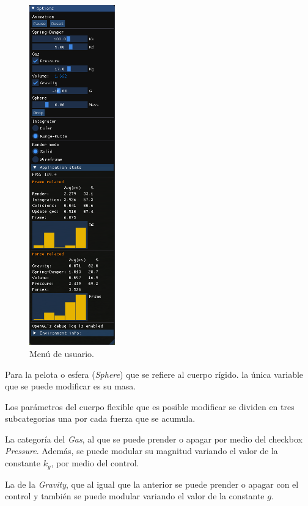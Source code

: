 \begin{figure}
 \centering
 \includegraphics[width=0.33\textwidth]{Img/04/menu}
 \caption[Menú de usuario del programa]{Menú de usuario.}
 \label{programa:menu}
\end{figure}

Para la pelota o esfera (\emph{\textenglish{Sphere}}) que se refiere al cuerpo rígido.
la única variable que se puede modificar es su masa.

Los parámetros del cuerpo flexible que es posible modificar se dividen en tres subcategorias una por cada fuerza que se acumula.

La categoría del \emph{Gas}, al que se puede prender o apagar por medio del checkbox \emph{\textenglish{Pressure}}. 
Además, se puede modular su magnitud variando el valor de la constante $k_{g}$, por medio del control.

La de la \emph{\textenglish{Gravity}}, que al igual que la anterior se puede prender o apagar con el control  y también se puede modular variando el valor de la constante $g$.

